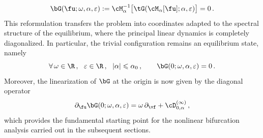 \documentclass[a4paper,reqno,10pt]{article}
\newcommand{\pa}{\partial}
\begin{document}
\begin{equation}\label{Eq-New1}
	\begin{aligned}
		\bG(\fu;\omega,\alpha,\varepsilon)
		:= \cM_{\alpha}^{-1}\big[ \tG(\cM_{\alpha}[\fu];\alpha,\varepsilon)\big]=0 \,.
	\end{aligned}
\end{equation}
This reformulation transfers the problem into coordinates adapted to the spectral structure of the equilibrium, where the principal linear dynamics is completely diagonalized. In particular, the trivial configuration remains an equilibrium state, namely
\begin{equation}\label{bG.equizero}
	\forall \,  \omega\in\R\,, \  \ \varepsilon\in\R\,, \  \ |\alpha|\leqslant\alpha_0\,,
	\qquad
	\bG(0;\omega,\alpha,\varepsilon)=0 \,.
\end{equation}
Moreover, the linearization of $\bG$ at the origin is now given by the diagonal operator
\begin{equation}\label{Normal-lin-equili}
\partial_{\fu} \bG(0;\omega,\alpha,\varepsilon)
=
\omega\,\pa_{\vf} + \cD_{0,\alpha}^{(\infty)}\,,
\end{equation}
which provides the fundamental starting point for the nonlinear bifurcation analysis carried out in the subsequent sections.
\end{document}
